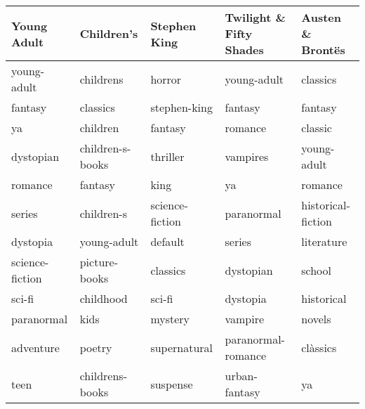 \begin{tabular}{lllll}
\toprule
     Young Adult &        Children's &     Stephen King & Twilight \& Fifty Shades &    Austen \& Brontës \\
\midrule
     young-adult &         childrens &           horror &             young-adult &            classics \\
         fantasy &          classics &     stephen-king &                 fantasy &             fantasy \\
              ya &          children &          fantasy &                 romance &             classic \\
       dystopian &  children-s-books &         thriller &                vampires &         young-adult \\
         romance &           fantasy &             king &                      ya &             romance \\
          series &        children-s &  science-fiction &              paranormal &  historical-fiction \\
        dystopia &       young-adult &          default &                  series &          literature \\
 science-fiction &     picture-books &         classics &               dystopian &              school \\
          sci-fi &         childhood &           sci-fi &                dystopia &          historical \\
      paranormal &              kids &          mystery &                 vampire &              novels \\
       adventure &            poetry &     supernatural &      paranormal-romance &            clàssics \\
            teen &   childrens-books &         suspense &           urban-fantasy &                  ya \\
\bottomrule
\end{tabular}
